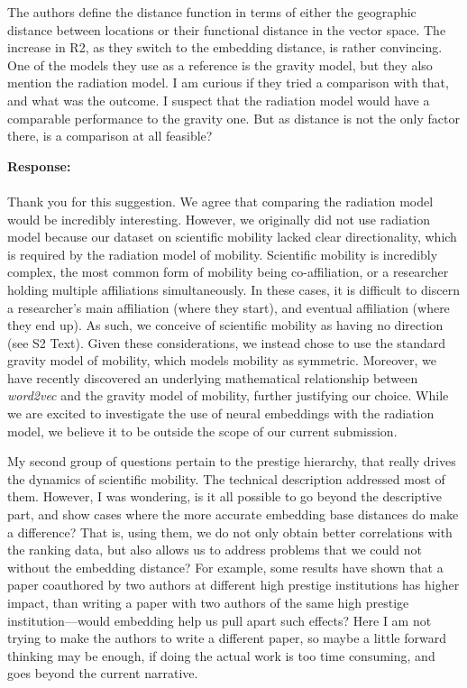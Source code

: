 \documentclass[12pt,a4paper]{article}
\newcommand{\response}[1]{{\noindent \textbf{Response:} \\ \\ \noindent #1}}
\newcommand{\rcomment}[1]{%
\vspace{10pt}
\begin{tcolorbox}[colback=black!3,colframe=white!45!black, left=0pt, right=0pt, top=0pt, bottom=0pt, arc=0pt,outer arc=0pt, grow to left by=-0.5cm,grow to right by=-0.5cm]
#1
\end{tcolorbox}
}
\begin{document}
\rcomment{
The authors define the distance function in terms of either the geographic distance between locations or their functional distance in the vector space. The increase in R2, as they switch to the embedding distance, is rather convincing. One of the models they use as a reference is the gravity model, but they also mention the radiation model. I am curious if they tried a comparison with that, and what was the outcome. I suspect that the radiation model would have a comparable performance to the gravity one. But as distance is not the only factor there, is a comparison at all feasible?
}

\response{Thank you for this suggestion. 
We agree that comparing the radiation model would be incredibly interesting.
However, we originally did not use radiation model because our dataset on scientific mobility lacked clear directionality, which is required by the radiation model of mobility. 
Scientific mobility is incredibly complex, the most common form of mobility being co-affiliation, or a researcher holding multiple affiliations simultaneously. 
In these cases, it is difficult to discern a researcher's main affiliation (where they start), and eventual affiliation (where they end up).
As such, we conceive of scientific mobility as having no direction (see S2 Text). 
Given these considerations, we instead chose to use the standard gravity model of mobility, which models mobility as symmetric.
Moreover, we have recently discovered an underlying mathematical relationship between \textit{word2vec} and the gravity model of mobility, further justifying our choice. 
While we are excited to investigate the use of neural embeddings with the radiation model, we believe it to be outside the scope of our current submission. 
}

\rcomment{
  My second group of questions pertain to the prestige hierarchy, that really drives the dynamics of scientific mobility. The technical description addressed most of them. However, I was wondering, is it all possible to go beyond the descriptive part, and show cases where the more accurate embedding base distances do make a difference? That is, using them, we do not only obtain better correlations with the ranking data, but also allows us to address problems that we could not without the embedding distance? For example, some results have shown that a paper coauthored by two authors at different high prestige institutions has higher impact, than writing a paper with two authors of the same high prestige institution—would embedding help us pull apart such effects? Here I am not trying to make the authors to write a different paper, so maybe a little forward thinking may be enough, if doing the actual work is too time consuming, and goes beyond the current narrative.
}
\end{document}
